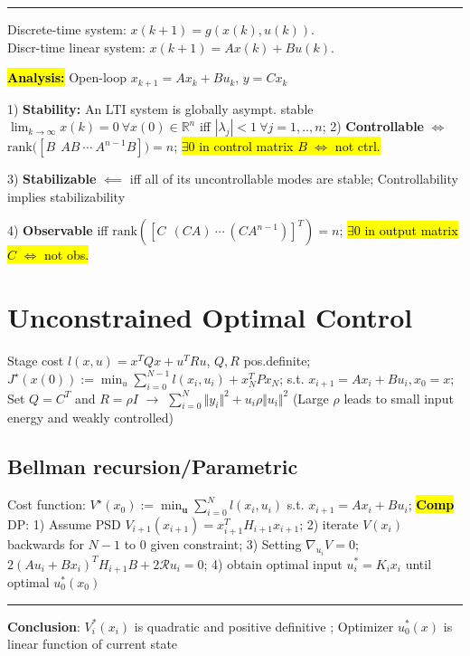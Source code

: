 \documentclass[10pt,a4paper,landscape]{article}
\newcommand{\hlc}[2][yellow]{ {\sethlcolor{#1} \hl{#2}} }
\newcommand{\quadRule}{\vspace{-3pt}\rule{0.23\textwidth}{0.4pt}}
\newcommand{\comp}{\footnotesize{\hlc[cyan]{\textbf{Comp}}}} %
\begin{document}
\begin{multicols*}{4}
\quadRule

Discrete-time system: $x(k+1)= g(x(k),u(k))$.\\
Discr-time linear system: $x(k+1)= Ax(k) + Bu(k)$.

\hl{\textbf{Analysis:}}
Open-loop $x_{k+1} = Ax_k + Bu_k$, $y = Cx_k$

1) \textbf{Stability:} An LTI system is globally asympt. stable $\lim_{k\rightarrow \infty} x(k) = 0 \: \forall x(0)\in\mathbb{R}^n$ iff $ |\lambda_j|<1 \: \forall j=1,..,n$;
2) \textbf{Controllable} $\iff$ 
$ \mathrm{rank}\big([B\:\:AB\:\cdots\:A^{n-1}B]\big) = n$; 
\hl{$\exists 0$ in control matrix $B$ $\iff$ not ctrl.}

3) \textbf{Stabilizable} $\impliedby$  iff all of its uncontrollable modes are stable; Controllability implies stabilizability

4) \textbf{Observable} iff $\mathrm{rank}([C\:\:(CA)\:\cdots\:(CA^{n-1})]^T) = n$; \hl{$\exists 0$ in output matrix $C$ $\iff$ not obs.}

\section{Unconstrained Optimal Control}
Stage cost $l(x,u) = x^T Q x + u^TRu$, $Q,R$ pos.definite;
$J^\star(x(0)) := \min_u \sum_{i=0}^{N-1} l(x_i,u_i) + x_N^T P x_N $;
s.t. $x_{i+1} = Ax_i + Bu_i, x_0 = x$; Set $Q = C^T$ and $R = \rho I$ $\rightarrow$  $\sum_{i=0}^N \Vert y_i \Vert^2 + u_i\rho  \Vert u_i \Vert^2$ (Large $\rho$ leads to small input energy and weakly controlled)

\subsection{Bellman recursion/Parametric}
Cost function: $V^{\star}\left(x_{0}\right):=\min _{\mathbf{u}} \sum_{i=0}^{N} l(x_i,u_i)$ s.t. $x_{i+1}=A x_{i}+B u_{i}$; \comp DP: 1) Assume PSD $V_{i+1}(x_{i+1}) = x^T_{i+1}H_{i+1}x_{i+1}$; 2) iterate $V(x_i)$ backwards for $N-1$ to 0 given constraint; 3) Setting $\nabla_{u_i}V=0$;  $2(Au_i+Bx_i)^{T} H_{i+1} B + 2\mathcal{R} u_i=0$; 4) obtain optimal input $u^*_i = K_i x_i$ until optimal $u_0^*(x_0)$

\quadRule

\textbf{Conclusion}: $V_{i}^*(x_{i})$ is quadratic and positive definitive ; Optimizer $u_0^*(x)$ is linear function of current state


\end{multicols*}
\end{document}
